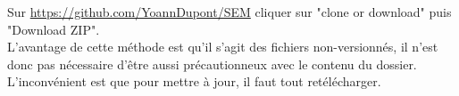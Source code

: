 \documentclass[manual-fr.tex]{subfiles}
\begin{document}
Sur \url{https://github.com/YoannDupont/SEM} cliquer sur "clone or download" puis "Download ZIP".\\

L'avantage de cette méthode est qu'il s'agit des fichiers non-versionnés, il
n'est donc pas nécessaire d'être aussi précautionneux avec le contenu du
dossier. L'inconvénient est que pour mettre à jour, il faut tout
retélécharger.
\end{document}

